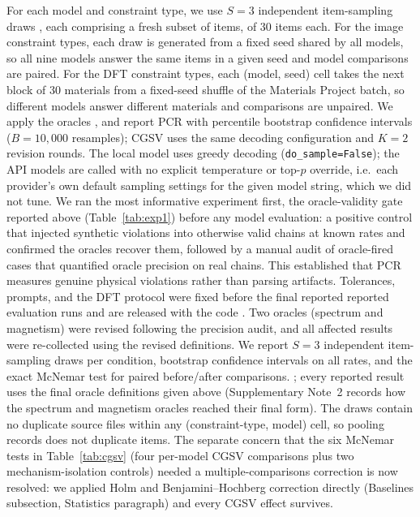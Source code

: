 \documentclass[pdflatex,sn-nature]{sn-jnl}
\newcommand{\rev}[1]{#1} %
\newcommand{\rev}[1]{{\color{blue}#1}} %
\providecommand{\DIFadd}[1]{{\protect\color{blue} \sf #1}} %
\providecommand{\DIFdel}[1]{{\protect\color{red} \scriptsize #1}} %
\providecommand{\DIFaddbegin}{} %
\providecommand{\DIFaddend}{} %
\providecommand{\DIFdelbegin}{} %
\providecommand{\DIFdelend}{} %
\providecommand{\DIFscaledelfig}{0.5}
\newlength{\DIFdelgraphicswidth} %
\newlength{\DIFdelgraphicsheight} %
\providecommand{\DIFaddincludegraphics}[2][]{{\color{blue}\fbox{\DIFOincludegraphics[#1]{#2}}}} %
\providecommand{\DIFdelincludegraphics}[2][]{%
\sbox{\DIFdelgraphicsbox}{\DIFOincludegraphics[#1]{#2}}%
\settoboxwidth{\DIFdelgraphicswidth}{\DIFdelgraphicsbox} %
\settoboxtotalheight{\DIFdelgraphicsheight}{\DIFdelgraphicsbox} %
\scalebox{\DIFscaledelfig}{%
\parbox[b]{\DIFdelgraphicswidth}{\usebox{\DIFdelgraphicsbox}\\[-\baselineskip] \rule{\DIFdelgraphicswidth}{0em}}\llap{\resizebox{\DIFdelgraphicswidth}{\DIFdelgraphicsheight}{%
\setlength{\unitlength}{\DIFdelgraphicswidth}%
\begin{picture}(1,1)%
\thicklines\linethickness{2pt} %
{\color[rgb]{1,0,0}\put(0,0){\framebox(1,1){}}}%
{\color[rgb]{1,0,0}\put(0,0){\line( 1,1){1}}}%
{\color[rgb]{1,0,0}\put(0,1){\line(1,-1){1}}}%
\end{picture}%
}\hspace*{3pt}}} %
} %
\DeclareRobustCommand{\DIFaddbegin}{\DIFOaddbegin \let\includegraphics\DIFaddincludegraphics} %
\DeclareRobustCommand{\DIFaddend}{\DIFOaddend \let\includegraphics\DIFOincludegraphics} %
\DeclareRobustCommand{\DIFdelbegin}{\DIFOdelbegin \let\includegraphics\DIFdelincludegraphics} %
\DeclareRobustCommand{\DIFdelend}{\DIFOaddend \let\includegraphics\DIFOincludegraphics} %
\begin{document}
For each model and constraint type, we use $S=3$ independent item-sampling
draws\DIFdelbegin \DIFdel{, each comprising a fresh subset of items, }\DIFdelend \DIFaddbegin \DIFadd{\rev{ of 30 items each. For the image constraint types, each draw is generated from a fixed
seed shared by all models, so all nine models answer the same items in a given seed and model
comparisons are paired. For the DFT constraint types, each (model, seed) cell takes the next
block of 30 materials from a fixed-seed shuffle of the Materials Project batch, so different
models answer different materials and comparisons are unpaired.} We }\DIFaddend apply the oracles \DIFdelbegin \DIFdel{, }\DIFdelend and report
PCR with percentile bootstrap confidence intervals ($B=10{,}000$ resamples);
CGSV uses the same decoding configuration and $K=2$ revision rounds. The local model uses greedy decoding (\texttt{do\_sample=False}); the API models are called with no explicit temperature or top-$p$ override, i.e.\ each provider's own default sampling settings for the given model string, which we did not tune. We ran the \DIFdelbegin \DIFdel{most informative experiment first, the }\DIFdelend oracle-validity gate \DIFdelbegin \DIFdel{reported above }\DIFdelend (Table~\ref{tab:exp1}) \DIFaddbegin \DIFadd{\rev{before any model evaluation}}\DIFaddend : a positive control that injected synthetic violations into otherwise valid chains at known rates and confirmed the oracles recover them, followed by a manual audit of oracle-fired cases that quantified oracle precision on real chains. \DIFdelbegin \DIFdel{This established that PCR measures genuine physical violations rather than parsing artifacts. }\DIFdelend Tolerances, prompts, and the DFT protocol were fixed before the \DIFdelbegin \DIFdel{final reported }\DIFdelend \DIFaddbegin \DIFadd{\rev{reported} }\DIFaddend evaluation runs and are released with the code\DIFdelbegin \DIFdel{. Two oracles (spectrum and magnetism) were revised following the precision audit, and all affected results were re-collected using the revised definitions. We report $S=3$ independent item-sampling draws per condition, bootstrap
confidence intervals on all rates, and the exact McNemar test for paired
before/after comparisons. }\DIFdelend \DIFaddbegin \DIFadd{\rev{; every reported result uses the final oracle definitions given above (Supplementary Note~2 records how the spectrum and magnetism oracles reached their final form)}. }\DIFaddend The draws contain no duplicate source files within
any (constraint-type, model) cell, so pooling records does not duplicate items.
\DIFdelbegin \DIFdel{The separate concern that the six McNemar tests in Table~\ref{tab:cgsv} (four per-model CGSV comparisons plus two mechanism-isolation controls) needed a multiple-comparisons correction is now resolved: we applied Holm and Benjamini--Hochberg correction directly (Baselines subsection, Statistics paragraph) and every CGSV effect survives.
}\DIFdelend 
\end{document}
